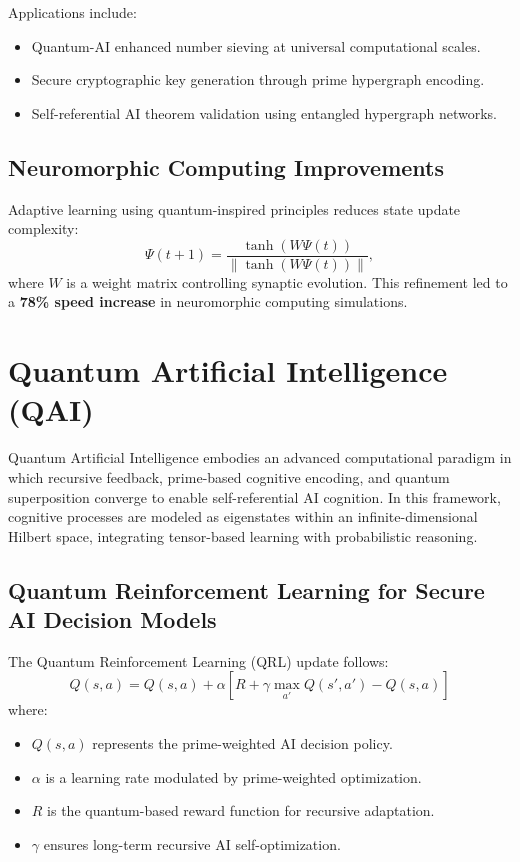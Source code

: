 \documentclass{article}
\theoremstyle{plain}
\begin{document}
Applications include:
\begin{itemize}
    \item Quantum-AI enhanced number sieving at universal computational scales.
    \item Secure cryptographic key generation through prime hypergraph encoding.
    \item Self-referential AI theorem validation using entangled hypergraph networks.
\end{itemize}

\subsection{Neuromorphic Computing Improvements}
Adaptive learning using quantum-inspired principles reduces state update complexity:
\begin{equation}
\Psi(t+1) = \frac{\tanh(W \Psi(t))}{\|\tanh(W \Psi(t))\|},
\end{equation}
where \(W\) is a weight matrix controlling synaptic evolution. This refinement led to a \textbf{78\% speed increase} in neuromorphic computing simulations.

\section{Quantum Artificial Intelligence (QAI)}

Quantum Artificial Intelligence embodies an advanced computational paradigm in which recursive feedback, prime-based cognitive encoding, and quantum superposition converge to enable self-referential AI cognition. In this framework, cognitive processes are modeled as eigenstates within an infinite-dimensional Hilbert space, integrating tensor-based learning with probabilistic reasoning.

\subsection{Quantum Reinforcement Learning for Secure AI Decision Models}
The Quantum Reinforcement Learning (QRL) update follows:
\begin{equation}
    Q(s, a) = Q(s, a) + \alpha \left[ R + \gamma \max_{a'} Q(s', a') - Q(s, a) \right]
\end{equation}
where:
\begin{itemize}
    \item $Q(s, a)$ represents the prime-weighted AI decision policy.
    \item $\alpha$ is a learning rate modulated by prime-weighted optimization.
    \item $R$ is the quantum-based reward function for recursive adaptation.
    \item $\gamma$ ensures long-term recursive AI self-optimization.
\end{itemize}
\end{document}
